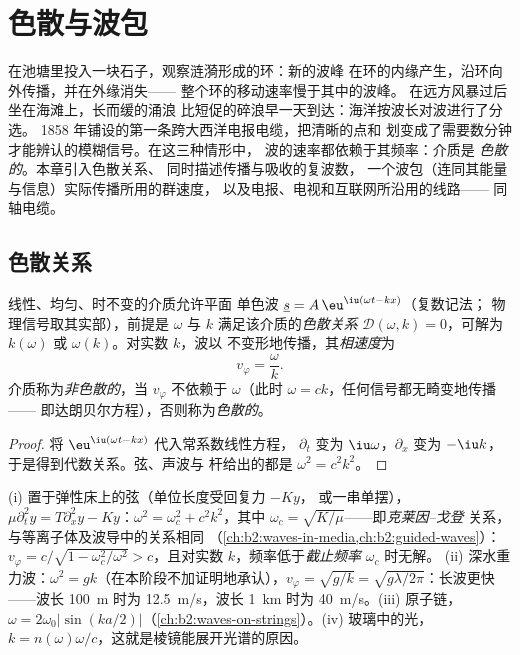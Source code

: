 \chapter{色散与波包}\label{ch:b2:dispersion-wave-packets}

在池塘里投入一块石子，观察涟漪形成的环：新的波峰
在环的内缘产生，沿环向外传播，并在外缘消失——
整个环的移动速率慢于其中的波峰。
在远方风暴过后坐在海滩上，长而缓的涌浪
比短促的碎浪早一天到达：海洋按波长对波进行了分选。
1858 年铺设的第一条跨大西洋电报电缆，把清晰的点和
划变成了需要数分钟才能辨认的模糊信号。在这三种情形中，
波的速率都依赖于其频率：介质是
\emph{色散的}。本章引入色散关系、
同时描述传播与吸收的复波数，
一个波包（连同其能量与信息）实际传播所用的群速度，
以及电报、电视和互联网所沿用的线路——
同轴电缆。

\section{色散关系}

\begin{definition}\label{def:b2:dispersion-wave-packets:relation}
线性、均匀、时不变的介质允许平面
单色波 $\underline s = A\,\eu^{\iu(\omega t - kx)}$（复数记法；
物理信号取其实部），前提是 $\omega$ 与 $k$
满足该介质的\emph{色散关系} $\mathcal D(\omega, k)
= 0$，可解为 $k(\omega)$ 或 $\omega(k)$。对实数 $k$，波以
不变形地传播，其\emph{相速度}为
\[
v_\varphi = \frac\omega k .
\]
介质称为\emph{非色散的}，当 $v_\varphi$ 不依赖于
$\omega$（此时 $\omega = ck$，任何信号都无畸变地传播——
即达朗贝尔方程），否则称为\emph{色散的}。
\end{definition}

\begin{proof}
将 $\eu^{\iu(\omega t - kx)}$ 代入常系数线性方程，
$\partial_t$ 变为 $\iu\omega$，$\partial_x$ 变为
$-\iu k$，于是得到代数关系。弦、声波与
杆给出的都是 $\omega^2 = c^2k^2$。
\end{proof}

\begin{example}[色散与非色散]\label{ex:b2:dispersion-wave-packets:examples}
(i) 置于弹性床上的弦（单位长度受回复力 $-Ky$，
或一串单摆），$\mu\partial_t^2y = T\partial_x^2y - Ky$：$\omega^2 = \omega_c^2
+ c^2k^2$，其中 $\omega_c = \sqrt{K/\mu}$——即\emph{克莱因–戈登}
关系，与等离子体及波导中的关系相同
（\cref{ch:b2:waves-in-media,ch:b2:guided-waves}）：$v_\varphi = c/\sqrt{1 -
\omega_c^2/\omega^2} > c$，且对实数 $k$，频率低于\emph{截止频率} $\omega_c$ 时无解。
(ii) 深水重力波：$\omega^2 = gk$（在本阶段不加证明地承认），$v_\varphi =
\sqrt{g/k} = \sqrt{g\lambda/2\pi}$：长波更快——波长 \qty{100}{m} 时为
\qty{12.5}{m/s}，波长 \qty{1}{km} 时为 \qty{40}{m/s}。(iii) 原子链，$\omega =
2\omega_0|\sin(ka/2)|$（\cref{ch:b2:waves-on-strings}）。(iv) 玻璃中的光，
$k = n(\omega)\omega/c$，这就是棱镜能展开光谱的原因。
\end{example}

